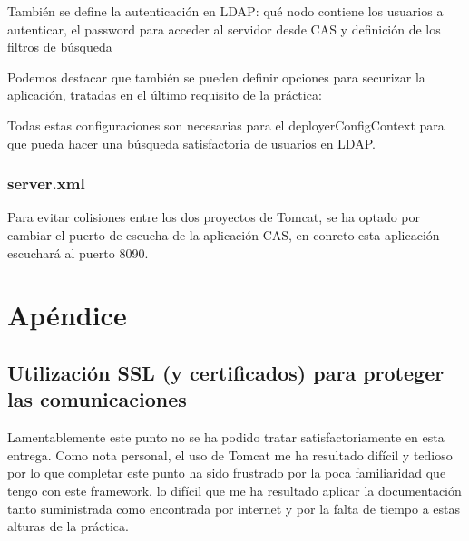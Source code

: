 \documentclass[10pt,a4paper]{article}
\begin{document}
También se define la autenticación en LDAP: qué nodo contiene los usuarios a autenticar, el password para acceder al servidor desde CAS y definición de los filtros de búsqueda


Podemos destacar que también se pueden definir opciones para securizar la aplicación, tratadas en el último requisito de la práctica:


Todas estas configuraciones son necesarias para el deployerConfigContext para que pueda hacer una búsqueda satisfactoria de usuarios en LDAP.

\subsubsection*{server.xml}
Para evitar colisiones entre los dos proyectos de Tomcat, se ha optado por cambiar el puerto de escucha de la aplicación CAS, en conreto esta aplicación escuchará al puerto 8090.\\


\section*{Apéndice}
\subsection*{Utilización SSL (y certificados) para proteger las comunicaciones}
Lamentablemente este punto no se ha podido tratar satisfactoriamente en esta entrega. Como nota personal, el uso de Tomcat me ha resultado difícil y tedioso por lo que completar este punto ha sido frustrado por la poca familiaridad que tengo con este framework, lo difícil que me ha resultado aplicar la documentación tanto suministrada como encontrada por internet y por la falta de tiempo a estas alturas de la práctica.
\end{document}
